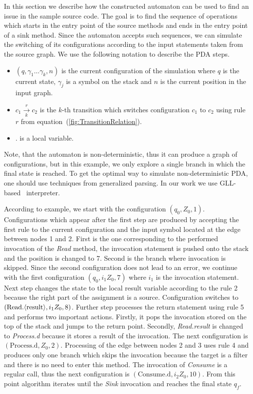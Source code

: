In this section we describe how the constructed automaton can be used to find an issue in the sample source code.
The goal is to find the sequence of operations which starts in the entry point of the source methods and ends in the entry point of a sink method.
Since the automaton accepts such sequences, we can simulate the switching of its configurations according to the input statements taken from the source graph.
We use the following notation to describe the PDA steps.
\begin{itemize}
\item $(q, \gamma_1 \ldots \gamma_k, n)$ is the current configuration of the simulation where $q$ is the current state, $\gamma_j$ is a symbol on the stack and $n$ is the current position in the input graph.
\item $c_1 \xrightarrow[k]{r} c_2$ is the $k$-th transition which switches configuration $c_1$ to $c_2$ using rule $r$ from equation~(\ref{fig:TransitionRelation}).
\item {}. is a local variable.
\end{itemize}
Note, that the automaton is non-deterministic, thus it can produce a graph of configurations, but in this example, we only explore a single branch in which the final state is reached.
To get the optimal way to simulate non-deterministic PDA, one should use techniques from generalized parsing.
In our work we use GLL-based~\cite{scott2010gll, GrigorevR16} interpreter.

According to example, we start with the configuration $(q_0, Z_0, 1)$.
Configurations which appear after the first step are produced by accepting the first rule to the current configuration and the input symbol located at the edge between nodes 1 and 2.
First is the one corresponding to the performed invocation of the \textit{Read} method, the invocation statement is pushed onto the stack and the position is changed to 7.
Second is the branch where invocation is skipped.
Since the second configuration does not lead to an error, we continue with the first configuration $(q_0, i_1 Z_0, 7)$ where $i_1$ is the invocation statement.
Next step changes the state to the local \textlangle{}result\textrangle{} variable according to the rule 2 because the right part of the assignment is a source. Configuration switches to $(\text{Read.\textlangle{}result\textrangle{}}, i_1 Z_0, 8)$.
Further step processes the return statement using rule 5 and performs two important actions.
Firstly, it pops the invocation stored on the top of the stack and jumps to the return point.
Secondly, \textit{Read.\textlangle{}result\textrangle{}} is changed to \textit{Process.\textlangle{}d\textrangle{}} because it stores a result of the invocation.
The next configuration is $(\text{Process.d}, Z_0, 2)$.
Processing of the edge between nodes 2 and 3 uses rule 4 and produces only one branch which skips the invocation because the target is a filter and there is no need to enter this method.
The invocation of \textit{Consume} is a regular call, thus the next configuration is $(\text{Consume.d}, i_2 Z_0, 10)$.
From this point algorithm iterates until the \textit{Sink} invocation and reaches the final state $q_f$.

